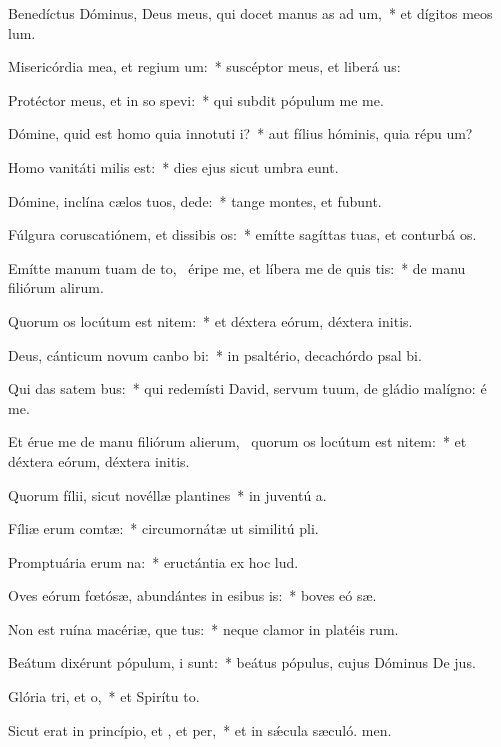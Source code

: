 \item Benedíctus Dóminus, Deus meus, qui docet manus as ad um,~* et dígitos meos  lum.
\item Misericórdia mea, et regium um:~* suscéptor meus, et liberá us:
\item Protéctor meus, et in so spevi:~* qui subdit pópulum me  me.
\item Dómine, quid est homo quia innotuti i?~* aut fílius hóminis, quia répu um?
\item Homo vanitáti milis  est:~* dies ejus sicut umbra eunt.
\item Dómine, inclína cælos tuos,  dede:~* tange montes, et fubunt.
\item Fúlgura coruscatiónem, et dissibis os:~* emítte sagíttas tuas, et conturbá os.
\item Emítte manum tuam de to,~\pscross{} éripe me, et líbera me de quis tis:~* de manu filiórum alirum.
\item Quorum os locútum est nitem:~* et déxtera eórum, déxtera initis.
\item Deus, cánticum novum canbo bi:~* in psaltério, decachórdo psal bi.
\item Qui das satem bus:~* qui redemísti David, servum tuum, de gládio malígno: é me.
\item Et érue me de manu filiórum alierum,~\pscross{} quorum os locútum est nitem:~* et déxtera eórum, déxtera initis.
\item Quorum fílii, sicut novéllæ plantines~* in juventú a.
\item Fíliæ erum comtæ:~* circumornátæ ut similitú pli.
\item Promptuária erum na:~* eructántia ex hoc  lud.
\item Oves eórum fœtósæ, abundántes in esibus is:~* boves eó sæ.
\item Non est ruína macériæ, que tus:~* neque clamor in platéis rum.
\item Beátum dixérunt pópulum, i  sunt:~* beátus pópulus, cujus Dóminus De jus.
\item Glória tri, et o,~* et Spirítu to.
\item Sicut erat in princípio, et , et per,~* et in sǽcula sæculó. men.
